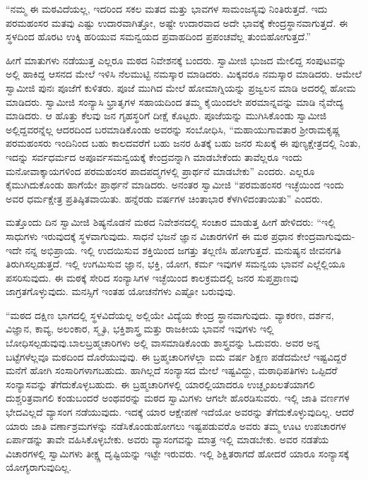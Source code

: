  “ನಮ್ಮ ಈ ಮಠವಿದೆಯಲ್ಲ, ಇದರಿಂದ ಸಕಲ ಮತದ ಮತ್ತು ಭಾವಗಳ ಸಾಮಂಜಸ್ಯವು ನಿಂತಿರುತ್ತದೆ. ಇದು ಪರಮಹಂಸರ ಮತವು ಎಷ್ಟು ಉದಾರವಾಗಿತ್ತೋ, ಅಷ್ಟೇ ಉದಾರವಾದ ಅದೇ ಭಾವಕ್ಕೆ ಕೇಂದ್ರಸ್ಥಾನವಾಗುತ್ತದೆ. ಈ ಸ್ಥಳದಿಂದ ಹೊರಟ ಉಕ್ಕಿ ಹರಿಯುವ ಸಮನ್ವಯದ ಪ್ರವಾಹದಿಂದ ಪ್ರಪಂಚವೆಲ್ಲ ತುಂಬಿಹೋಗುತ್ತದೆ.” 

 ಹೀಗೆ ಮಾತುಗಳು ನಡೆಯುತ್ತ ಎಲ್ಲರೂ ಮಠದ ನಿವೇಶನಕ್ಕೆ ಬಂದರು. ಸ್ವಾಮೀಜಿ ಭುಜದ ಮೇಲಿದ್ದ ಸಂಪುಟವನ್ನು ಅಲ್ಲಿ ಹಾಕಿದ್ದ ಆಸನದ ಮೇಲೆ ಇಳಿಸಿ ನೆಲಮುಟ್ಟಿ ನಮಸ್ಕಾರ ಮಾಡಿದರು. ಮಿಕ್ಕವರೂ ನಮಸ್ಕಾರ ಮಾಡಿದರು. ಆಮೇಲೆ ಸ್ವಾಮೀಜಿ ಪುನಃ ಪೂಜೆಗೆ ಕುಳಿತರು. ಪೂಜೆ ಮುಗಿದ ಮೇಲೆ ಹೋಮಾಗ್ನಿಯನ್ನು ಪ್ರಜ್ವಲನ ಮಾಡಿ ಅದರಲ್ಲಿ ಹೋಮ ಮಾಡಿದರು. ಸ್ವಾಮೀಜಿ ಸಂನ್ಯಾಸಿ ಭ್ರಾತೃಗಳ ಸಹಾಯದಿಂದ ತಮ್ಮ ಕೈಯಿಂದಲೇ ಪರಮಾನ್ನವನ್ನು ಮಾಡಿ ನೈವೇದ್ಯ ಮಾಡಿದರು. ಆ ಹೊತ್ತು ಕೆಲವು ಜನ ಗೃಹಸ್ಥರಿಗೆ ದೀಕ್ಷೆ ಕೊಟ್ಟರು. ಪೂಜೆಯನ್ನು ಮುಗಿಸಿಕೊಂಡು ಸ್ವಾಮೀಜಿ ಅಲ್ಲಿದ್ದವರನ್ನೆಲ್ಲ ಆದರದಿಂದ ಬರಮಾಡಿಕೊಂಡು ಅವರನ್ನು ಸಂಬೋಧಿಸಿ, “ಮಹಾಯುಗಾವತಾರ ಶ‍್ರೀರಾಮಕೃಷ್ಣ ಪರಮಹಂಸರು ಇಂದಿನಿಂದ ಬಹು ಕಾಲದವರೆಗೆ ಬಹು ಜನರ ಹಿತಕ್ಕೆ ಬಹು ಜನರ ಸುಖಕ್ಕೆ ಈ ಪುಣ್ಯಕ್ಷೇತ್ರದಲ್ಲಿ ನಿಂತು, ಇದನ್ನು ಸರ್ವಧರ್ಮದ ಅಪೂರ್ವ\break ಸಮನ್ವಯಕ್ಕೆ ಕೇಂದ್ರವನ್ನಾಗಿ ಮಾಡಬೇಕೆಂದು ತಾವೆಲ್ಲರೂ ಇಂದು ಮನೋವಾಕ್ಕಾಯಗಳಿಂದ ಪರಮಹಂಸರ ಪಾದಪದ್ಮಗಳಲ್ಲಿ ಪ್ರಾರ್ಥನೆ ಮಾಡಬೇಕು” ಎಂದರು. ಎಲ್ಲರೂ ಕೈಮುಗಿದುಕೊಂಡು ಹಾಗೆಯೇ ಪ್ರಾರ್ಥನೆ ಮಾಡಿದರು. ಅನಂತರ ಸ್ವಾಮೀಜಿ “ಪರಮಹಂಸರ ಇಚ್ಛೆಯಿಂದ ಇಂದು ಅವರ ಧರ್ಮಕ್ಷೇತ್ರ ಪ್ರತಿಷ್ಠಿತವಾಯಿತು. ಹನ್ನೆರಡು ವರ್ಷಗಳ ಚಿಂತಾಭಾರ ಕೆಳಗಿಳಿದಂತಾಯಿತು” ಎಂದರು. 

 ಮತ್ತೊಂದು ದಿನ ಸ್ವಾಮೀಜಿ ಶಿಷ್ಯನೊಡನೆ ಮಠದ ನಿವೇಶನದಲ್ಲಿ ಸಂಚಾರ ಮಾಡುತ್ತ ಹೀಗೆ ಹೇಳಿದರು: “ಇಲ್ಲಿ ಸಾಧುಗಳು ಇರುವುದಕ್ಕೆ ಸ್ಥಳವಾಗುವುದು. ಸಾಧನೆ ಭಜನೆ ಜ್ಞಾನ ವಿಚಾರಗಳಿಗೆ ಈ ಮಠ ಪ್ರಧಾನ ಕೇಂದ್ರವಾಗುವುದು- ಇದೇ ನನ್ನ ಅಭಿಪ್ರಾಯ. ಇಲ್ಲಿ ಉದಯಿಸುವ ಶಕ್ತಿಯಿಂದ ಜಗತ್ತು ತಲ್ಲಣಿಸಿ ಹೋಗುತ್ತದೆ. ಮನುಷ್ಯನ ಜೀವನಗತಿ ತಿರುಗಿಸಲ್ಪಡುತ್ತದೆ. ಇಲ್ಲಿ ಉಗಮಿಸುವ ಜ್ಞಾನ, ಭಕ್ತಿ, ಯೋಗ, ಕರ್ಮ ಇವುಗಳ ಸಮನ್ವಯ ಭಾವನೆ ಎಲ್ಲೆಲ್ಲಿಯೂ ಪಸರಿಸುವುದು. ಈ ಮಠಕ್ಕೆ ಸೇರಿದ ಸಂನ್ಯಾಸಿಗಳ ಇಚ್ಛೆಯಿಂದ ಕಾಲಕ್ರಮದಲ್ಲಿ ಜನರ ಸುಪ್ತಪ್ರಾಣವು ಜಾಗ್ರತಗೊಳ್ಳುವುದು. ಮನಸ್ಸಿಗೆ ಇಂತಹ ಯೋಚನೆಗಳು ಎಷ್ಟೋ ಬರುವುವು. 

 “ಮಠದ ದಕ್ಷಿಣ ಭಾಗದಲ್ಲಿ ಸ್ಥಳವಿದೆಯಲ್ಲ ಅಲ್ಲಿಯೇ ವಿದ್ಯೆಯ ಕೇಂದ್ರ ಸ್ಥಾನವಾಗುವುದು. ವ್ಯಾಕರಣ, ದರ್ಶನ, ವಿಜ್ಞಾನ, ಕಾವ್ಯ, ಅಲಂಕಾರ, ಸ್ಮೃತಿ, ಭಕ್ತಿಶಾಸ್ತ್ರ ಮತ್ತು ರಾಜಕೀಯ ಭಾವನೆ ಇವುಗಳು ಇಲ್ಲಿ ಬೋಧಿಸಲ್ಪಡುವುವು.\break ಬಾಲಬ್ರಹ್ಮಚಾರಿಗಳು ಅಲ್ಲಿ ವಾಸಮಾಡಿಕೊಂಡು ಶಾಸ್ತ್ರವನ್ನು ಓದುವರು. ಅವರ ಅನ್ನ ಬಟ್ಟೆಗಳೆಲ್ಲವೂ ಮಠದಿಂದ ದೊರೆಯುವುವು. ಈ ಬ್ರಹ್ಮಚಾರಿಗಳೆಲ್ಲಾ ಐದು ವರ್ಷ ಶಿಕ್ಷಣ ಪಡೆದಮೇಲೆ ಇಷ್ಟವಿದ್ದರೆ ಮನೆಗೆ ಹೋಗಿ ಸಂಸಾರಿಗಳಾಗಬಹುದು. ಹಾಗಿಲ್ಲದೆ ಸಂನ್ಯಾಸದ ಮೇಲೆ ಇಷ್ಟವಿದ್ದು, ಮಠಾಧಿಪತಿಗಳು ಒಪ್ಪಿದರೆ ಸಂನ್ಯಾಸವನ್ನು ತೆಗೆದುಕೊಳ್ಳಬಹುದು. ಈ ಬ್ರಹ್ಮಚಾರಿಗಳಲ್ಲಿ ಯಾರಲ್ಲಿಯಾದರೂ ಉಚ್ಛೃಂಖಲತೆಯಾಗಲಿ ದುಶ್ಚರಿತ್ರವಾಗಲಿ ಕಂಡುಬಂದರೆ ಅಂಥವರನ್ನು ಮಠದ ಸ್ವಾಮಿಗಳು ಆಗಲೇ‌ ಹೊರಡಿಸುವರು. ಇಲ್ಲಿ ಜಾತಿ ವರ್ಣಗಳ ಭೇದವಿಲ್ಲದೆ ವ್ಯಾಸಂಗ ನಡೆಯುವುದು. ಇದಕ್ಕೆ ಯಾರ ಆಕ್ಷೇಪಣೆ ಇದೆಯೋ ಅವರನ್ನು ತೆಗೆದುಕೊಳ್ಳುವುದಿಲ್ಲ. ಆದರೆ ಯಾರು ಜಾತಿ ವರ್ಣಾಶ್ರಮಗಳನ್ನು ನಡೆಸಿಕೊಂಡುಹೋಗಲು ಇಷ್ಟಪಡುವರೊ ಅವರು ತಮ್ಮ ಊಟ ಉಪಚಾರಗಳ ಏರ್ಪಾಡನ್ನು ತಾವೇ ವಹಿಸಿಕೊಳ್ಳಬೇಕು. ಅವರು ವ್ಯಾಸಂಗವನ್ನು ಮಾತ್ರ ಇಲ್ಲಿ ಮಾಡಬೇಕು. ಅವರ ನಡತೆಯ ವಿಚಾರಗಳಲ್ಲಿ ಸ್ವಾಮಿಗಳು ತೀಕ್ಷ್ಣ ದೃಷ್ಟಿಯನ್ನು ಇಟ್ಟೇ ಇರುವರು. ಇಲ್ಲಿ ಶಿಕ್ಷಿತರಾಗದೆ ಹೋದರೆ ಯಾರೂ ಸಂನ್ಯಾಸಕ್ಕೆ ಯೋಗ್ಯರಾಗುವುದಿಲ್ಲ. 

